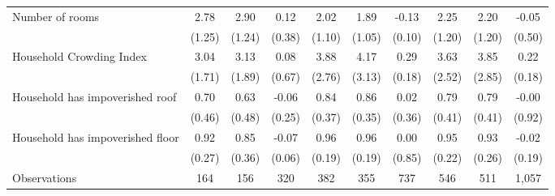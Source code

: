 \begin{tabular}{l*{9}c}
Number of rooms&2.78&2.90&0.12&2.02&1.89&-0.13&2.25&2.20&-0.05\\
&(1.25)&(1.24)&(0.38)&(1.10)&(1.05)&(0.10)&(1.20)&(1.20)&(0.50)\\
Household Crowding Index&3.04&3.13&0.08&3.88&4.17&0.29&3.63&3.85&0.22\\
&(1.71)&(1.89)&(0.67)&(2.76)&(3.13)&(0.18)&(2.52)&(2.85)&(0.18)\\
Household has impoverished roof&0.70&0.63&-0.06&0.84&0.86&0.02&0.79&0.79&-0.00\\
&(0.46)&(0.48)&(0.25)&(0.37)&(0.35)&(0.36)&(0.41)&(0.41)&(0.92)\\
Household has impoverished floor&0.92&0.85&-0.07&0.96&0.96&0.00&0.95&0.93&-0.02\\
&(0.27)&(0.36)&(0.06)&(0.19)&(0.19)&(0.85)&(0.22)&(0.26)&(0.19)\\
\hline
Observations & 164 & 156 & 320 & 382 & 355 & 737 & 546 & 511 & 1,057 \\
\hline\hline
\end{tabular}
